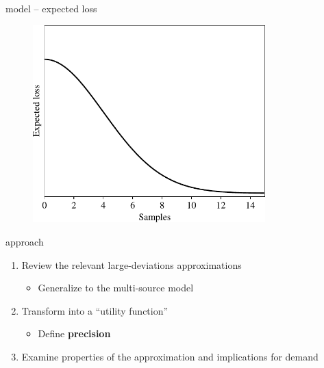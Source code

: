 \documentclass[square,]{gBakerBeamer}
\renewcommand{\|}{\,|\,}
\begin{document}
\begin{frame}{model -- expected loss}

  \begin{figure}[h]
    \centering
    \includegraphics[width=0.8\textwidth]{figures/figlosspres.pdf}
  \end{figure}

  \note{%

  }
\end{frame}


\begin{frame}{approach}


  \begin{enumerate}
    \item<1-> Review the relevant large-deviations approximations
          \begin{itemize}
            \item Generalize to the multi-source model
          \end{itemize}
    \item<2-> Transform into a ``utility function''
          \begin{itemize}
            \item Define \textbf{precision}
          \end{itemize}

    \item<3-> Examine properties of the approximation and implications for demand
  \end{enumerate}

  \note{%

  }
\end{frame}


\end{document}
